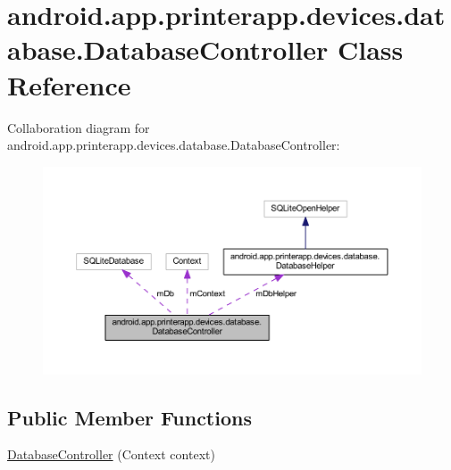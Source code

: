 \hypertarget{classandroid_1_1app_1_1printerapp_1_1devices_1_1database_1_1_database_controller}{}\section{android.\+app.\+printerapp.\+devices.\+database.\+Database\+Controller Class Reference}
\label{classandroid_1_1app_1_1printerapp_1_1devices_1_1database_1_1_database_controller}


Collaboration diagram for android.\+app.\+printerapp.\+devices.\+database.\+Database\+Controller\+:
\nopagebreak
\begin{figure}[H]
\begin{center}
\leavevmode
\includegraphics[width=350pt]{classandroid_1_1app_1_1printerapp_1_1devices_1_1database_1_1_database_controller__coll__graph}
\end{center}
\end{figure}
\subsection*{Public Member Functions}
\begin{DoxyCompactItemize}
\item 
\hyperlink{classandroid_1_1app_1_1printerapp_1_1devices_1_1database_1_1_database_controller_a9078c0c1018c1dff291691c54b9fddf4}{Database\+Controller} (Context context)
\end{DoxyCompactItemize}
